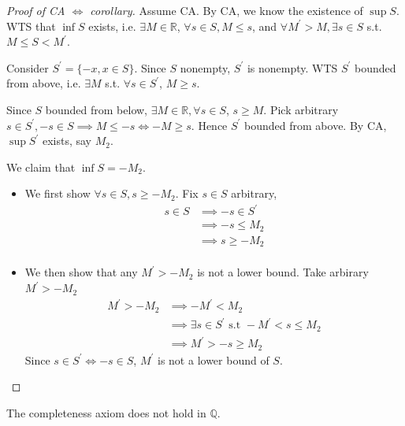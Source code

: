 \begin{proof}[Proof of CA $\iff$ corollary]
    Assume CA. 
    By CA, we know the existence of $\sup S$. 
        WTS that $\inf S$ exists, i.e. $\exists M \in \mathbb{R}$,
        $\forall s \in S, M \leq s$, and 
        $\forall M^{\prime} > M, \exists s \in S$ s.t. 
        $M \leq S < M^{\prime}$. 
        \medskip 

        Consider $S^{\prime} = \{ -x, x \in S \} $. 
        Since $S$ nonempty, $S^{\prime}$ is nonempty. 
        WTS $S^{\prime}$ bounded from above, i.e. $\exists M$ 
        s.t. $\forall s \in S^{\prime}$, $M \geq s$. 
        \medskip 

        Since $S$ bounded from below, $\exists M \in \mathbb{R}, \forall s \in S$,
        $s \geq M$. Pick arbitrary $s \in S^{\prime}, -s \in S \implies M \leq -s \iff -M \geq s$.
        Hence $S^{\prime}$  bounded from above. By CA, $\sup S^{\prime}$ exists, say $M_2$. 
        \medskip 

        We claim that $\inf S = -M_2$. 
        \begin{itemize}
            \item We first show $\forall s \in S, s \geq -M_2$. Fix $s \in S$ arbitrary, 
            \begin{align*}
                s \in S & \implies -s \in S^{\prime} \\
                & \implies -s \leq M_2 \\
                & \implies s \geq -M_2 \\
            \end{align*}
            \item We then show that any $M^{\prime} > -M_2$ is not a lower bound. 
            Take arbirary $M^{\prime} > -M_2$
            \begin{align*}
                M^{\prime} > -M_2 & \implies - M^{\prime} < M_2 \\
                & \implies \exists s \in S^{\prime} \text{ s.t } -M^{\prime} < s \leq M_2 \\
                & \implies M^{\prime} > -s \geq M_2
            \end{align*}
            Since $s \in S^{\prime} \iff -s \in S$, $M^{\prime}$ is not a lower bound of $S$.
        \end{itemize} 
\end{proof}

\begin{remark}
    The completeness axiom does not hold in $\mathbb{Q}$.
\end{remark}

